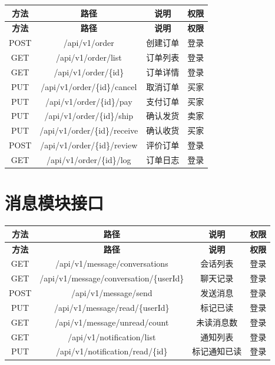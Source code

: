\documentclass[12pt,a4paper,UTF8]{ctexart}
\begin{document}
\begin{longtable}{|c|c|c|c|}
    \hline
    \textbf{方法} & \textbf{路径} & \textbf{说明} & \textbf{权限} \\
    \hline
    \endfirsthead
    \hline
    \textbf{方法} & \textbf{路径} & \textbf{说明} & \textbf{权限} \\
    \hline
    \endhead
    \hline
    \endfoot

    POST & /api/v1/order & 创建订单 & 登录 \\
    \hline
    GET & /api/v1/order/list & 订单列表 & 登录 \\
    \hline
    GET & /api/v1/order/\{id\} & 订单详情 & 登录 \\
    \hline
    PUT & /api/v1/order/\{id\}/cancel & 取消订单 & 买家 \\
    \hline
    PUT & /api/v1/order/\{id\}/pay & 支付订单 & 买家 \\
    \hline
    PUT & /api/v1/order/\{id\}/ship & 确认发货 & 卖家 \\
    \hline
    PUT & /api/v1/order/\{id\}/receive & 确认收货 & 买家 \\
    \hline
    POST & /api/v1/order/\{id\}/review & 评价订单 & 登录 \\
    \hline
    GET & /api/v1/order/\{id\}/log & 订单日志 & 登录 \\
    \hline
\end{longtable}

\section{消息模块接口}

\begin{longtable}{|c|c|c|c|}
    \hline
    \textbf{方法} & \textbf{路径} & \textbf{说明} & \textbf{权限} \\
    \hline
    \endfirsthead
    \hline
    \textbf{方法} & \textbf{路径} & \textbf{说明} & \textbf{权限} \\
    \hline
    \endhead
    \hline
    \endfoot

    GET & /api/v1/message/conversations & 会话列表 & 登录 \\
    \hline
    GET & /api/v1/message/conversation/\{userId\} & 聊天记录 & 登录 \\
    \hline
    POST & /api/v1/message/send & 发送消息 & 登录 \\
    \hline
    PUT & /api/v1/message/read/\{userId\} & 标记已读 & 登录 \\
    \hline
    GET & /api/v1/message/unread/count & 未读消息数 & 登录 \\
    \hline
    GET & /api/v1/notification/list & 通知列表 & 登录 \\
    \hline
    PUT & /api/v1/notification/read/\{id\} & 标记通知已读 & 登录 \\
    \hline
\end{longtable}
\end{document}
